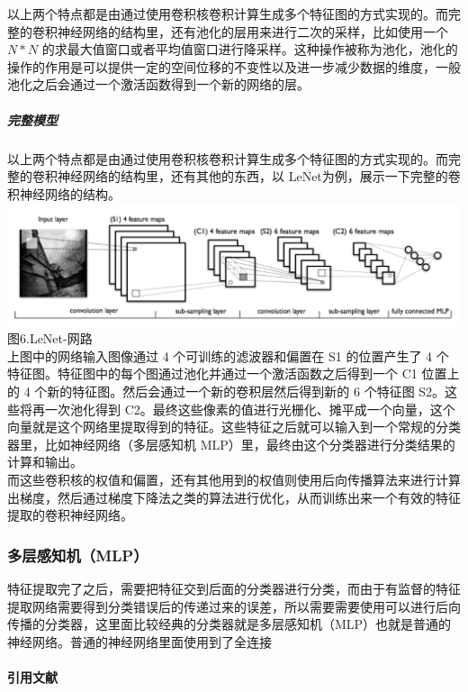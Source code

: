 以上两个特点都是由通过使用卷积核卷积计算生成多个特征图的方式实现的。而完整的卷积神经网络的结构里，还有池化的层用来进行二次的采样，比如使用一个
\(N*N\)
的求最大值窗口或者平均值窗口进行降采样。这种操作被称为池化，池化的操作的作用是可以提供一定的空间位移的不变性以及进一步减少数据的维度，一般池化之后会通过一个激活函数得到一个新的网络的层。

\subparagraph{完整模型}\label{ux5b8cux6574ux6a21ux578b}

以上两个特点都是由通过使用卷积核卷积计算生成多个特征图的方式实现的。而完整的卷积神经网络的结构里，还有其他的东西，以
LeNet为例，展示一下完整的卷积神经网络的结构。\\\includegraphics{picture/lenet.png}\\图6.LeNet-网路\\上图中的网络输入图像通过
4 个可训练的滤波器和偏置在 S1 的位置产生了 4
个特征图。特征图中的每个图通过池化并通过一个激活函数之后得到一个 C1
位置上的 4 个新的特征图。然后会通过一个新的卷积层然后得到新的 6 个特征图
S2。这些将再一次池化得到
C2。最终这些像素的值进行光栅化、摊平成一个向量，这个向量就是这个网络里提取得到的特征。这些特征之后就可以输入到一个常规的分类器里，比如神经网络（多层感知机
MLP）里，最终由这个分类器进行分类结果的计算和输出。\\而这些卷积核的权值和偏置，还有其他用到的权值则使用后向传播算法来进行计算出梯度，然后通过梯度下降法之类的算法进行优化，从而训练出来一个有效的特征提取的卷积神经网络。

\subsubsection{多层感知机（MLP）}\label{ux591aux5c42ux611fux77e5ux673amlp}

特征提取完了之后，需要把特征交到后面的分类器进行分类，而由于有监督的特征提取网络需要得到分类错误后的传递过来的误差，所以需要需要使用可以进行后向传播的分类器，这里面比较经典的分类器就是多层感知机（MLP）也就是普通的神经网络。普通的神经网络里面使用到了全连接

\paragraph*{引用文献}\label{ux5f15ux7528ux6587ux732e}

